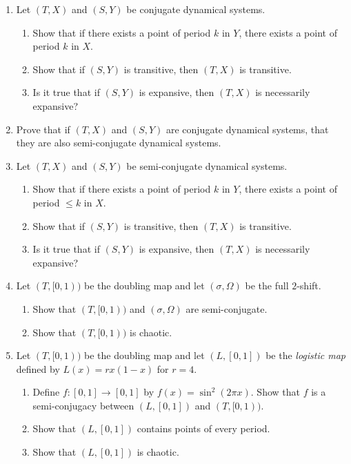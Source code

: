 \documentclass[letter]{article}
\begin{document}
\begin{enumerate}
		\begin{enumerate}
			\item Let $(T,X)$ and $(S,Y)$ be conjugate dynamical systems.
				\begin{enumerate}
					\item Show that if there exists a point of period $k$ in $Y$, there exists a point
						of period $k$ in $X$.
					\item Show that if $(S,Y)$ is transitive, then $(T,X)$ is transitive.
					\item Is it true that if $(S,Y)$ is expansive, then $(T,X)$ is necessarily expansive?
				\end{enumerate}
			\item Prove that if $(T,X)$ and $(S,Y)$ are conjugate dynamical systems, that they are also semi-conjugate dynamical
				systems.
			\item Let $(T,X)$ and $(S,Y)$ be semi-conjugate dynamical systems.
				\begin{enumerate}
					\item Show that if there exists a point of period $k$ in $Y$, there exists a point
						of period $\leq k$ in $X$.
					\item Show that if $(S,Y)$ is transitive, then $(T,X)$ is transitive.
					\item Is it true that if $(S,Y)$ is expansive, then $(T,X)$ is necessarily expansive?
				\end{enumerate}
			\item Let $(T,[0,1))$ be the doubling map and let
                                $(\sigma, \Omega)$ be the full $2$-shift.
				\begin{enumerate}
					\item Show that $(T,[0,1))$ and $(\sigma, \Omega)$ are semi-conjugate.
					\item Show that $(T,[0,1))$ is chaotic.
				\end{enumerate}
			\item Let $(T,[0,1))$ be the doubling map and let $(L,[0,1])$ be the \emph{logistic map} defined by
				$L(x)=rx(1-x)$ for $r=4$.
				\begin{enumerate}
					\item Define $f\colon [0,1]\to[0,1]$ by $f(x)=\sin^2(2\pi x)$. Show that $f$ is a semi-conjugacy
						between $(L,[0,1])$ and $(T,[0,1))$.
					\item Show that $(L,[0,1])$ contains points of every period.
					\item Show that $(L,[0,1])$ is chaotic.
				\end{enumerate}
		\end{enumerate}

	\end{enumerate}
\end{document}
